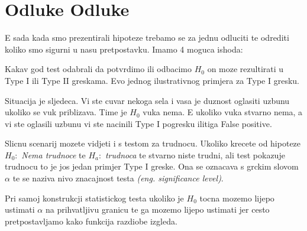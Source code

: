 \chapter{Odluke Odluke}
E sada kada smo prezentirali hipoteze trebamo se za jednu odluciti te odrediti koliko smo sigurni u nasu pretpostavku. Imamo 4 moguca ishoda:


\begin{table}[h]
\end{table}

Kakav god test odabrali da potvrdimo ili odbacimo $H_0$ on moze rezultirati u Type I ili Type II greskama. Evo jednog ilustrativnog primjera za Type I gresku.

Situacija je sljedeca. Vi ste cuvar nekoga sela i vasa je duznost oglasiti uzbunu ukoliko se vuk priblizava. Time je $H_0$ vuka nema. E ukoliko vuka stvarno nema, a vi ste oglasili uzbunu vi ste nacinili Type I pogresku ilitiga False positive.

Slicnu scenarij mozete vidjeti i s testom za trudnocu. Ukoliko krecete od hipoteze  $H_0:$ \emph{Nema trudnoce} te $H_a:$ \emph{trudnoca} te stvarno niste trudni, ali test pokazuje trudnocu to je jos jedan primjer Type I greske. Ona se oznacava s grckim slovom $\alpha$ te se naziva nivo znacajnost testa \textit{(eng. significance level)}. 

Pri samoj konstrukcji statistickog testa ukoliko je $H_0$ tocna mozemo lijepo ustimati $\alpha$ na prihvatljivu granicu te ga mozemo lijepo ustimati jer cesto pretpostavljamo kako funkcija razdiobe izgleda. 

